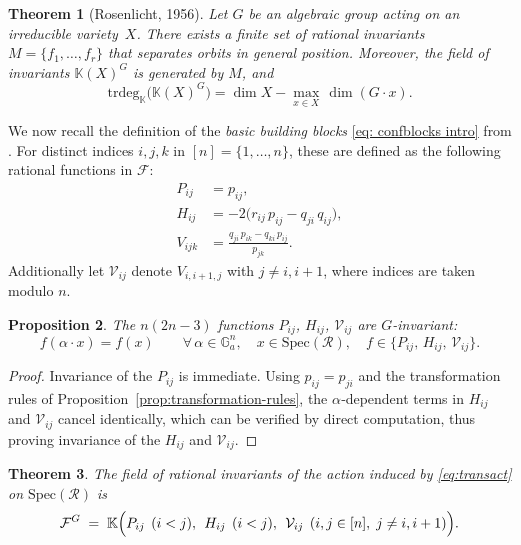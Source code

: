 \documentclass[12pt,a4paper]{extarticle}
\newtheorem{theorem}{Theorem}[section]
\newtheorem{proposition}[theorem]{Proposition}
\theoremstyle{definition}
\newcommand{\K}{\mathbb{K}}
\begin{document}
\begin{theorem}[Rosenlicht, 1956] \label{thm: Rosenlicht}
Let $G$ be an algebraic group acting on an irreducible variety~$X$.
There exists a finite set of rational invariants $M = \{f_1,\ldots,f_r\}$ that
separates orbits in general position. Moreover, the field of invariants
$\K(X)^G$ is generated by $M$, and
\begin{equation}\label{eq: trdegInvField}
\mathrm{trdeg}_\K\bigl(\K(X)^G\bigr)
  =
  \dim X - \max_{x\in X}\, \dim(G\cdot x).    
\end{equation}
\end{theorem}
We now recall the definition of the \emph{basic building blocks} \eqref{eq: confblocks intro} from \cite{CPPR}. 
For distinct
indices $i,j,k$ in $[n]=\{1,\ldots,n\}$, these are defined as the following rational functions in $\mathcal{F}$:
\begin{equation}\label{eq: confblocks}
\begin{aligned}
  P_{ij}
  &= p_{ij},\\
  H_{ij}
  &= -2\bigl(r_{ij}\,p_{ij}-q_{ji}\,q_{ij}\bigr),\\
  V_{ijk}
  &
= \frac{q_{ji}\,p_{ik}-q_{ki}\,p_{ij}}{p_{jk}}.
\end{aligned}
\end{equation}
Additionally let
$\mathcal{V}_{ij}$ denote $V_{i,i+1,j}$ with  $j\neq i,i+1$, where indices are taken modulo $n$.
\begin{proposition}\label{prop: inv}
The $n(2n-3)$  functions $P_{ij}$, $H_{ij}$, $\mathcal{V}_{ij}$ are $G$-invariant:
\[
  f(\alpha\cdot x) = f(x)
  \qquad
  \forall\,\alpha\in \mathbb{G}_a^n,\quad x\in \mathrm{Spec}(\mathcal{R}),\quad
  f\in\{P_{ij},\,H_{ij},\,\mathcal{V}_{ij}\}.
\]
\end{proposition}
\begin{proof}
 Invariance of the $P_{ij}$ is immediate. Using $p_{ij}=p_{ji}$ and the transformation rules of
Proposition~\ref{prop:transformation-rules}, the $\alpha$‑dependent terms in
$H_{ij}$ and $\mathcal{V}_{ij}$ cancel identically, which can be verified by direct computation, thus proving invariance of the $H_{ij}$ and $\mathcal{V}_{ij}$.
\end{proof}
\begin{theorem}\label{thm: main}
The field of rational invariants of the action induced by
\eqref{eq:transact} on $\mathrm{Spec}(\mathcal{R})$ is
\[
  \mathcal{F}^{G}
  \;=\;
  \K\Bigl(
    P_{ij}\;\,(i<j),\;\,
    H_{ij}\;\,(i<j),\;\,
    \mathcal{V}_{ij}\;\,(i,j\in[n],\;j\neq i,i+1)
  \Bigr).
\]
\end{theorem}
\end{document}
